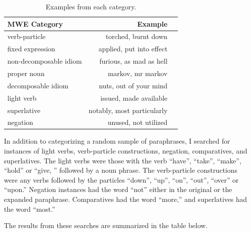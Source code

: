 \documentclass[11pt]{article}
\begin{document}
\begin{table}[h]
\begin{center}
\begin{tabular}{|l|rl|}
\hline \bf MWE Category & \bf Example & \\ \hline
verb-particle & torched, burnt down  &\\
fixed expression & applied, put into effect &\\
non-decomposable idiom & furious, as mad as hell &\\
proper noun & markov, mr markov &\\
decomposable idiom & nuts, out of your mind &\\
light verb & issued, made available  &\\
superlative & notably, most particularly &\\
negation & unused, not utilized &\\
\hline
\end{tabular}
\end{center}
\caption{\label{font-table} Examples from each category. }
\end{table}

In addition to categorizing a random sample of paraphrases, I searched for instances of light verbs, verb-particle constructions, negation, comparatives, and superlatives. The light verbs were those with the verb “have”, “take”, “make”, “hold” or “give, ” followed by a noun phrase. The verb-particle constructions were any verbs followed by the particles “down”, “up”, “on”, “out”, “over” or “upon.” Negation instances had the word “not” either in the original or the expanded paraphrase. Comparatives had the word “more,” and superlatives had the word “most.”

The results from these searches are summarized in the table below.



%
%
% 
% 
\end{document}

